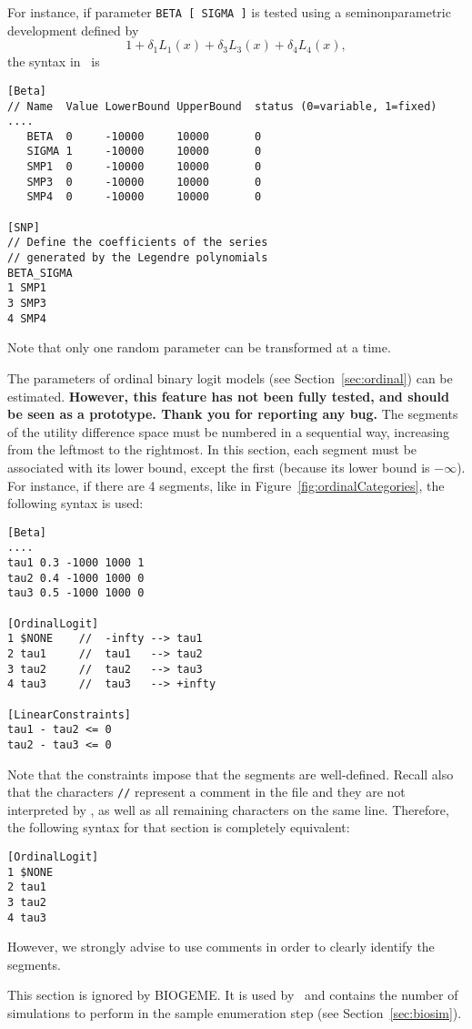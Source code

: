 \documentclass[12pt]{memoir}
\begin{document}
\begin{description}
For instance, if parameter \verb+BETA [ SIGMA ]+ is tested using a seminonparametric development defined by
\[
1 + \delta_1 L_1(x) + \delta_3 L_3(x) + \delta_4 L_4(x),
\]
the syntax in \BIOGEME\ is

{\footnotesize 
\begin{verbatim}
[Beta]
// Name  Value LowerBound UpperBound  status (0=variable, 1=fixed)
....
   BETA  0     -10000     10000       0
   SIGMA 1     -10000     10000       0  
   SMP1  0     -10000     10000       0
   SMP3  0     -10000     10000       0
   SMP4  0     -10000     10000       0

[SNP]
// Define the coefficients of the series 
// generated by the Legendre polynomials
BETA_SIGMA
1 SMP1
3 SMP3
4 SMP4
\end{verbatim}
}


Note that only one random parameter can be transformed  at a time. 

\item[\specitem{OrdinalLogit}] The parameters of ordinal binary logit
models (see  Section~\ref{sec:ordinal}) can be estimated. \textbf{However,
this feature has not been fully tested, and should be seen as a
prototype. Thank you for reporting any bug.} The segments of the
utility difference space must be numbered in a sequential  way,
increasing from the leftmost to the rightmost. In this section, each
segment must be associated with its lower bound, except the first
(because its lower bound is $-\infty$). For instance, if there are 4
segments, like in Figure~\vref{fig:ordinalCategories}, the following
syntax is used:  

{\footnotesize 
\begin{verbatim}
[Beta]
....
tau1 0.3 -1000 1000 1
tau2 0.4 -1000 1000 0 
tau3 0.5 -1000 1000 0 

[OrdinalLogit]
1 $NONE    //  -infty --> tau1 
2 tau1     //  tau1   --> tau2
3 tau2     //  tau2   --> tau3
4 tau3     //  tau3   --> +infty

[LinearConstraints]
tau1 - tau2 <= 0
tau2 - tau3 <= 0
\end{verbatim}
}

Note that the constraints impose that the segments are well-defined.
Recall also that the characters \verb+//+ represent a comment in the file and they are not interpreted by \BIOGEME , as well as all remaining characters on the same line. Therefore, the following syntax for that section is completely equivalent:
{\footnotesize 
\begin{verbatim}
[OrdinalLogit]
1 $NONE
2 tau1 
3 tau2 
4 tau3 
\end{verbatim}
}
However, we strongly advise to use comments in order to clearly identify the segments.
   \item[\specitem{SampleEnum}] This section is ignored by BIOGEME. It is
      used by \BIOSIM\ and contains the number of simulations to perform in
      the sample enumeration step (see Section~\ref{sec:biosim}). 


\end{description}
\end{document}
